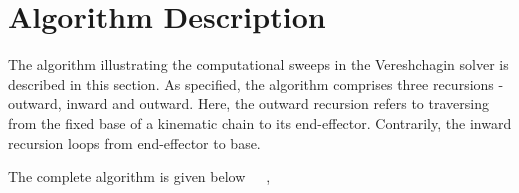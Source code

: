 \section{Algorithm Description}

The algorithm illustrating the computational sweeps in the Vereshchagin solver is described in this section. As specified, the algorithm comprises three recursions - outward, inward and outward. Here, the outward recursion refers to traversing from the fixed base of a kinematic chain to its end-effector. Contrarily, the inward recursion loops from end-effector to base. 

	The complete algorithm is given below~\cite{shakhimardanov2015composable}~\cite{vereshchagin1989modeling}~\cite{vukcevic2018extending},

	\newpage
\begin{algorithm}[h!]

	\label{Algorithm1}
	\SetAlgoLined
\end{algorithm}
